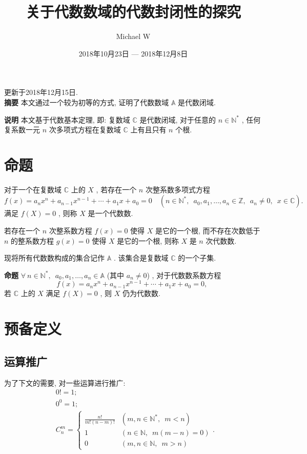 \documentclass{article}
\title{关于代数数域的代数封闭性的探究}
\author{Michael W}
\date{2018年10月23日 --- 2018年12月8日}
\renewcommand\.{.\hspace{3pt}}
\renewcommand\,{,\hspace{4pt}}
\renewcommand\:{:\hspace{3pt}}
\newcommand\A{,\hspace{6pt}}
\begin{document}
	
	\maketitle
	
	更新于2018年12月15日\. ~\\
	
	\textbf{摘要} \quad 本文通过一个较为初等的方式\, 证明了代数数域 $\mathbb{A}$ 是代数闭域\.
	
	\textbf{说明} \quad 本文基于代数基本定理\, 即\: 复数域 $\mathbb{C}$ 是代数闭域\, 对于任意的 $n \in \mathbb{N^{\ast}}$ \, 任何复系数一元 $n$ 次多项式方程在复数域 $\mathbb{C}$ 上有且只有 $n$ 个根\.
	
	\section{命题}
	对于一个在复数域 $\mathbb{C}$ 上的 $X$ \, 若存在一个 $n$ 次整系数多项式方程
	\begin{equation}
		f(x) = a_{n} x^{n} + a_{n-1} x^{n-1} + \cdots + a_{1} x + a_{0} = 0 \quad \left( n \in \mathbb{N^{\ast}} \A a_{0} , a_{1} , \ldots , a_{n} \in \mathbb{Z} \A a_{n} \neq 0 \A x \in \mathbb{C} \right) \.
	\end{equation}
	满足 $f \left( X \right) = 0$ \, 则称 $X$ 是一个代数数\.
	
	若存在一个 $n$ 次整系数方程 $f(x) = 0$ 使得 $X$ 是它的一个根\, 而不存在次数低于 $n$ 的整系数方程 $g(x) = 0$ 使得 $X$ 是它的一个根\, 则称 $X$ 是 $n$ 次代数数\.
	
	现将所有代数数构成的集合记作 $\mathbb{A}$ \. 该集合是复数域 $\mathbb{C}$ 的一个子集\.
	
	\textbf{命题} \quad $\forall \ n \in \mathbb{N^{\ast}} \A a_{0} , a_{1} , \ldots , a_{n} \in \mathbb{A}$ (其中 $a_{n} \neq 0$) \, 对于代数数系数方程
	\begin{equation}
		f(x) = a_{n} x^{n} + a_{n-1} x^{n-1} + \cdots + a_{1} x + a_{0} = 0 \,
	\end{equation}
	若 $\mathbb{C}$ 上的 $X$ 满足 $f(X) = 0$ \, 则 $X$ 仍为代数数\.
	
	\section{预备定义}
	\subsection{运算推广}
	为了下文的需要\, 对一些运算进行推广\:
	\begin{align*}
		& 0! = 1 ; \\
		& 0^{0} = 1 ; \\
		& C_{n}^{m} = \begin{cases}
		\frac{n!}{m! \left( n-m \right) !} & \left( m , n \in \mathbb{N^{\ast}} \A m < n \right) \\
		1 & \left( n \in \mathbb{N} \A m \left( m-n \right) = 0  \right) \\
		0 & \left( m , n \in \mathbb{N} \A m > n \right)
		\end{cases} \.
	\end{align*}
	
\end{document}
